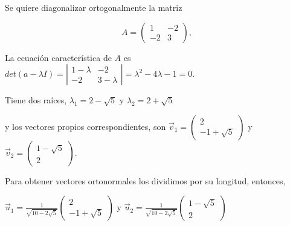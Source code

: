 {%


\begin{example}

Se quiere diagonalizar ortogonalmente la matriz 

\begin{equation}
A= \left(\begin{array}{cc} 1 & -2  \\ -2 & 3
\end{array}
 \right), \label{300}
\end{equation}

\bigskip


La ecuación característica de $A$ es $det(a- \lambda I)=  \left |\begin{array}{cc} 1-  \lambda & -2  \\ -2 & 3-\lambda  
\end{array}
 \right |= \lambda ^2 - 4 \lambda -1=0  $.
 
\bigskip
Tiene dos raíces, $\lambda_1= 2-\sqrt 5$  y  $\lambda_2= 2+\sqrt 5$


\bigskip


\noindent 
y los vectores propios correspondientes, son $ \vec{v}_1=  \left (\begin{array}{c} 2  \\ -1 + \sqrt 5  
\end{array}
 \right )$  y $ \vec{v}_2=  \left (\begin{array}{c} 1 - \sqrt 5   \\  2
\end{array}
 \right )$.
 
\bigskip

 
Para obtener vectores ortonormales los dividimos por su longitud, entonces,


\bigskip

$ \vec{u}_1= \frac{1}{\sqrt{10-2\sqrt 5}} \left (\begin{array}{c} 2  \\ -1 + \sqrt 5  
\end{array}
 \right )$ y  $ \vec{u}_2= \frac{1}{\sqrt{10-2\sqrt 5}} \left (\begin{array}{c} 1 - \sqrt 5   \\  2  
\end{array}
 \right )$


\end{example}}
